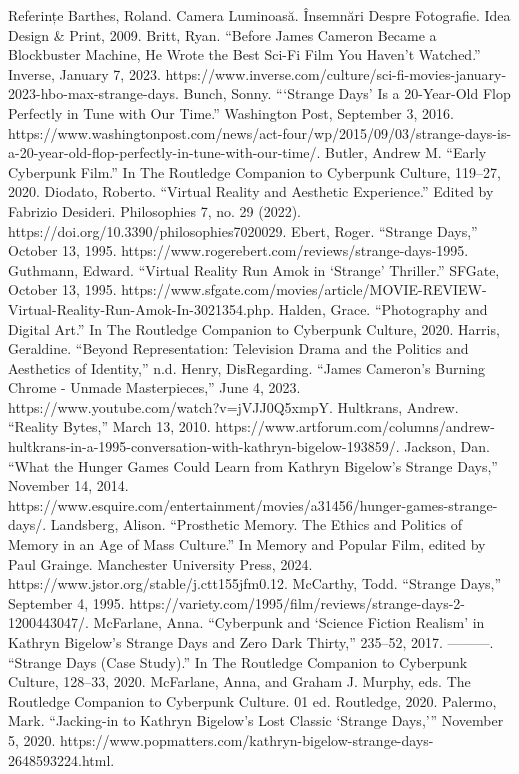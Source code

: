 \documentclass[a4paper, 12pt]{article}
\begin{document}
Referințe
Barthes, Roland. Camera Luminoasă. Însemnări Despre Fotografie. Idea Design & Print, 2009.
Britt, Ryan. “Before James Cameron Became a Blockbuster Machine, He Wrote the Best Sci-Fi Film You Haven’t Watched.” Inverse, January 7, 2023. https://www.inverse.com/culture/sci-fi-movies-january-2023-hbo-max-strange-days.
Bunch, Sonny. “‘Strange Days’ Is a 20-Year-Old Flop Perfectly in Tune with Our Time.” Washington Post, September 3, 2016. https://www.washingtonpost.com/news/act-four/wp/2015/09/03/strange-days-is-a-20-year-old-flop-perfectly-in-tune-with-our-time/.
Butler, Andrew M. “Early Cyberpunk Film.” In The Routledge Companion to Cyberpunk Culture, 119–27, 2020.
Diodato, Roberto. “Virtual Reality and Aesthetic Experience.” Edited by Fabrizio Desideri. Philosophies 7, no. 29 (2022). https://doi.org/10.3390/philosophies7020029.
Ebert, Roger. “Strange Days,” October 13, 1995. https://www.rogerebert.com/reviews/strange-days-1995.
Guthmann, Edward. “Virtual Reality Run Amok in `Strange’ Thriller.” SFGate, October 13, 1995. https://www.sfgate.com/movies/article/MOVIE-REVIEW-Virtual-Reality-Run-Amok-In-3021354.php.
Halden, Grace. “Photography and Digital Art.” In The Routledge Companion to Cyberpunk Culture, 2020.
Harris, Geraldine. “Beyond Representation: Television Drama and the Politics and Aesthetics of Identity,” n.d.
Henry, DisRegarding. “James Cameron’s Burning Chrome - Unmade Masterpieces,” June 4, 2023. https://www.youtube.com/watch?v=jVJJ0Q5xmpY.
Hultkrans, Andrew. “Reality Bytes,” March 13, 2010. https://www.artforum.com/columns/andrew-hultkrans-in-a-1995-conversation-with-kathryn-bigelow-193859/.
Jackson, Dan. “What the Hunger Games Could Learn from Kathryn Bigelow’s Strange Days,” November 14, 2014. https://www.esquire.com/entertainment/movies/a31456/hunger-games-strange-days/.
Landsberg, Alison. “Prosthetic Memory. The Ethics and Politics of Memory in an Age of Mass Culture.” In Memory and Popular Film, edited by Paul Grainge. Manchester University Press, 2024. https://www.jstor.org/stable/j.ctt155jfm0.12.
McCarthy, Todd. “Strange Days,” September 4, 1995. https://variety.com/1995/film/reviews/strange-days-2-1200443047/.
McFarlane, Anna. “Cyberpunk and ‘Science Fiction Realism’ in Kathryn Bigelow’s Strange Days and Zero Dark Thirty,” 235–52, 2017.
———. “Strange Days (Case Study).” In The Routledge Companion to Cyberpunk Culture, 128–33, 2020.
McFarlane, Anna, and Graham J. Murphy, eds. The Routledge Companion to Cyberpunk Culture. 01 ed. Routledge, 2020.
Palermo, Mark. “Jacking-in to Kathryn Bigelow’s Lost Classic ‘Strange Days,’” November 5, 2020. https://www.popmatters.com/kathryn-bigelow-strange-days-2648593224.html.
\end{document}
